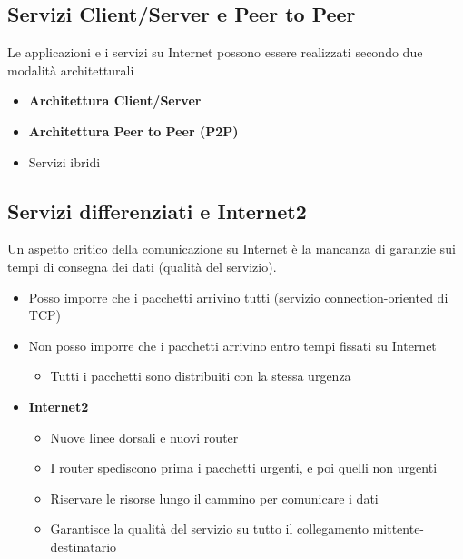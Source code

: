 \documentclass[a4paper,12pt]{article}
\begin{document}
\subsection*{Servizi Client/Server e Peer to Peer}
Le applicazioni e i servizi su Internet possono essere realizzati secondo due modalità architetturali
\begin{itemize}
  \item \textbf{Architettura Client/Server}
  \item \textbf{Architettura Peer to Peer (P2P)}
  \item Servizi ibridi
\end{itemize}
\subsection{Servizi differenziati e Internet2}
Un aspetto critico della comunicazione su Internet è la mancanza di garanzie sui tempi di consegna dei dati (qualità del servizio).
\begin{itemize}
  \item Posso imporre che i pacchetti arrivino tutti (servizio connection-oriented di TCP)
  \item Non posso imporre che i pacchetti arrivino entro tempi fissati su Internet
  \begin{itemize}
    \item Tutti i pacchetti sono distribuiti con la stessa urgenza
  \end{itemize}
  \item \textbf{Internet2}
  \begin{itemize}
    \item Nuove linee dorsali e nuovi router
    \item I router spediscono prima i pacchetti urgenti, e poi quelli non urgenti
    \item Riservare le risorse lungo il cammino per comunicare i dati
    \item Garantisce la qualità del servizio su tutto il collegamento mittente-destinatario
  \end{itemize}
\end{itemize}
\end{document}
